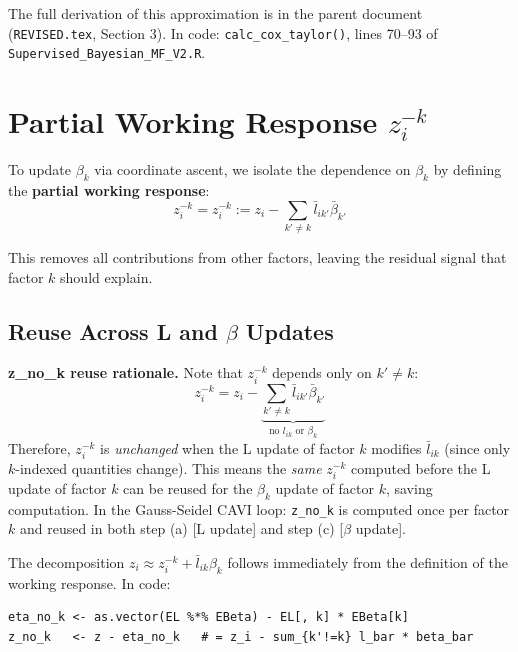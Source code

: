\documentclass[11pt]{article}
\newcommand{\zk}[0]{z^{-k}}
\begin{document}
The full derivation of this approximation is in the parent document
(\texttt{REVISED.tex}, Section 3).  In code: \texttt{calc\_cox\_taylor()},
lines 70--93 of \texttt{Supervised\_Bayesian\_MF\_V2.R}.

\section{Partial Working Response $\zk_i$}\label{sec:zk}

To update $\beta_k$ via coordinate ascent, we isolate the dependence on
$\beta_k$ by defining the \textbf{partial working response}:
\begin{equation}
  \zk_i = z_i^{-k} := z_i - \sum_{k' \neq k} \bar{l}_{ik'}\bar{\beta}_{k'}
  \label{eq:zk-def}
\end{equation}

This removes all contributions from other factors, leaving the residual
signal that factor $k$ should explain.

\subsection{Reuse Across L and $\beta$ Updates}

\begin{verifybox}
\textbf{z\_no\_k reuse rationale.}
Note that $z_i^{-k}$ depends only on $k' \neq k$:
\[
  z_i^{-k} = z_i - \underbrace{\sum_{k' \neq k} \bar{l}_{ik'}\bar{\beta}_{k'}}_{\text{no } l_{ik} \text{ or } \beta_k}
\]
Therefore, $z_i^{-k}$ is \emph{unchanged} when the L update of factor $k$
modifies $\bar{l}_{ik}$ (since only $k$-indexed quantities change).  This
means the \emph{same} $z_i^{-k}$ computed before the L update of factor $k$
can be reused for the $\beta_k$ update of factor $k$, saving computation.
In the Gauss-Seidel CAVI loop: \texttt{z\_no\_k} is computed once per factor
$k$ and reused in both step (a) [L update] and step (c) [$\beta$ update].
\end{verifybox}

The decomposition $z_i \approx z_i^{-k} + \bar{l}_{ik}\beta_k$ follows
immediately from the definition of the working response.  In code:
\begin{verbatim}
eta_no_k <- as.vector(EL %*% EBeta) - EL[, k] * EBeta[k]
z_no_k   <- z - eta_no_k   # = z_i - sum_{k'!=k} l_bar * beta_bar
\end{verbatim}
\end{document}
